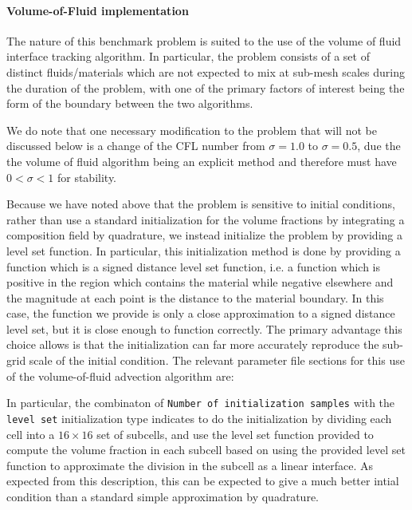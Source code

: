 \documentclass{article}
\begin{document}
\paragraph{Volume-of-Fluid implementation}

The nature of this benchmark problem is suited to the use of the volume of
fluid interface tracking algorithm.
In particular, the problem consists of a set of distinct fluids/materials which
are not expected to mix at sub-mesh scales during the duration of the problem,
with one of the primary factors of interest being the form of the boundary
between the two algorithms.

We do note that one necessary modification to the problem that will not be
discussed below is a change of the CFL number from $\sigma=1.0$ to
$\sigma=0.5$, due the the volume of fluid algorithm being an explicit method
and therefore must have $0<\sigma<1$ for stability.

Because we have noted above that the problem is sensitive to initial
conditions, rather than use a standard initialization for the volume fractions
by integrating a composition field by quadrature, we instead initialize the
problem by providing a level set function.
In particular, this initialization method is done by providing a function which
is a signed distance level set function, i.e. a function which is positive in
the region which contains the material while negative elsewhere and the
magnitude at each point is the distance to the material boundary.
In this case, the function we provide is only a close approximation to a signed
distance level set, but it is close enough to function correctly.
The primary advantage this choice allows is that the initialization can far
more accurately reproduce the sub-grid scale of the initial condition.
The relevant parameter file sections for this use of the volume-of-fluid
advection algorithm are:



In particular, the combinaton of \texttt{Number of initialization samples} with
the \texttt{level set} initialization type indicates to do the initialization by
dividing each cell into a $16\times 16$ set of subcells, and use the level set
function provided to compute the volume fraction in each subcell based on using
the provided level set function to approximate the division in the subcell as a
linear interface.
As expected from this description, this can be expected to give a much better
intial condition than a standard simple approximation by quadrature.
\end{document}
